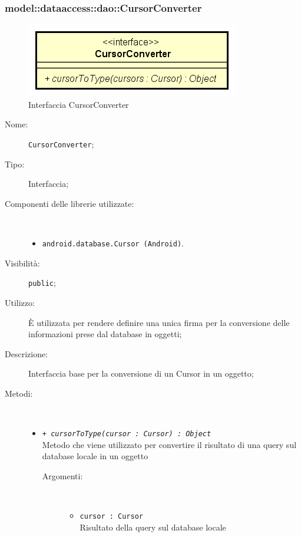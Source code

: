 \documentclass[../DefinizioneDiProdotto.tex]{subfiles}
\begin{document}
\subsubsection{model::dataaccess::dao::CursorConverter}

    \begin{figure}[H]
        \centering
        \includegraphics{img/CursorConverter.png}
        \caption{Interfaccia CursorConverter}\label{fig:model::dataaccess::dao::CursorConverter} 
    \end{figure}
    \begin{description}
\item[Nome:] \texttt{CursorConverter};
\item[Tipo:] Interfaccia;
\item[Componenti delle librerie utilizzate:] \
\begin{itemize}
\item \texttt{android.database.Cursor (Android)}.

\end{itemize}
\item[Visibilità:] \texttt{public};
\item[Utilizzo:] È utilizzata per rendere definire una unica firma per la conversione delle informazioni prese dal database in oggetti;
\item[Descrizione:] Interfaccia base per la conversione di un Cursor in un oggetto;
\item[Metodi:] \
\begin{itemize}
\item \texttt{+ \textit{cursorToType(cursor : Cursor) : Object}}\\
Metodo che viene utilizzato per convertire il risultato di una query sul database locale in un oggetto
 \begin{description}
\item[Argomenti:] \
\begin{itemize}
\item \texttt{cursor : Cursor}\\
Risultato della query sul database locale\end{itemize}
\end{description}
\end{itemize}
\end{description}
\end{document}
